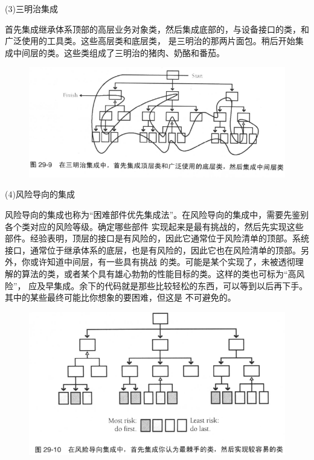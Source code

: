 \documentclass{article}
\begin{document}
\par
(3)三明治集成
\par
首先集成继承体系顶部的高层业务对象类，然后集成底部的，与设备接口的类，和广泛使用的工具类。这些高层类和底层类，
是三明治的那两片面包。稍后开始集成中间层的类。这些类组成了三明治的猪肉、奶酪和番茄。
\begin{figure}[htb]
    \centering
    \includegraphics[width=15cm]{figure28.png}
\end{figure}

\par
(4)风险导向的集成
\par
风险导向的集成也称为“困难部件优先集成法”。在风险导向的集成中，需要先鉴别各个类对应的风险等级。确定哪些部件
实现起来是最有挑战的，然后先实现这些部件。经验表明，顶层的接口是有风险的，因此它通常位于风险清单的顶部。系统
接口，通常位于继承体系的底层，也是有风险的，因此它也在风险清单的顶部。另外，你或许知道中间层，有一些具有挑战
的类。可能是某个实现了，未被透彻理解的算法的类，或者某个具有雄心勃勃的性能目标的类。这样的类也可标为“高风险”，
应及早集成。余下的代码就是那些比较轻松的东西，可以等到以后再下手。其中的某些最终可能比你想象的要困难，但这是
不可避免的。
\begin{figure}[htb]
    \centering
    \includegraphics[width=15cm]{figure29.png}
\end{figure}
\end{document}
